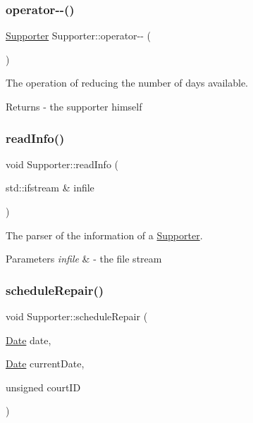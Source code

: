 \subsubsection{\texorpdfstring{operator-\/-\/()}{operator--()}}
{\footnotesize\ttfamily \mbox{\hyperlink{class_supporter}{Supporter}} Supporter\+::operator-\/-\/ (\begin{DoxyParamCaption}{ }\end{DoxyParamCaption})}



The operation of reducing the number of days available. 

\begin{DoxyReturn}{Returns}
-\/ the supporter himself 
\end{DoxyReturn}
\mbox{\label{class_supporter_ada44d7fddeaec2ec925faa375af7b29e}} 
\subsubsection{\texorpdfstring{read\+Info()}{readInfo()}}
{\footnotesize\ttfamily void Supporter\+::read\+Info (\begin{DoxyParamCaption}\item[{std\+::ifstream \&}]{infile }\end{DoxyParamCaption})}



The parser of the information of a \mbox{\hyperlink{class_supporter}{Supporter}}. 


\begin{DoxyParams}{Parameters}
{\em infile} & -\/ the file stream \\
\hline
\end{DoxyParams}
\mbox{\label{class_supporter_ac2880af1ce791e1d05cde3d63e754137}} 
\subsubsection{\texorpdfstring{schedule\+Repair()}{scheduleRepair()}}
{\footnotesize\ttfamily void Supporter\+::schedule\+Repair (\begin{DoxyParamCaption}\item[{\mbox{\hyperlink{class_date}{Date}}}]{date,  }\item[{\mbox{\hyperlink{class_date}{Date}}}]{current\+Date,  }\item[{unsigned}]{court\+ID }\end{DoxyParamCaption})}




